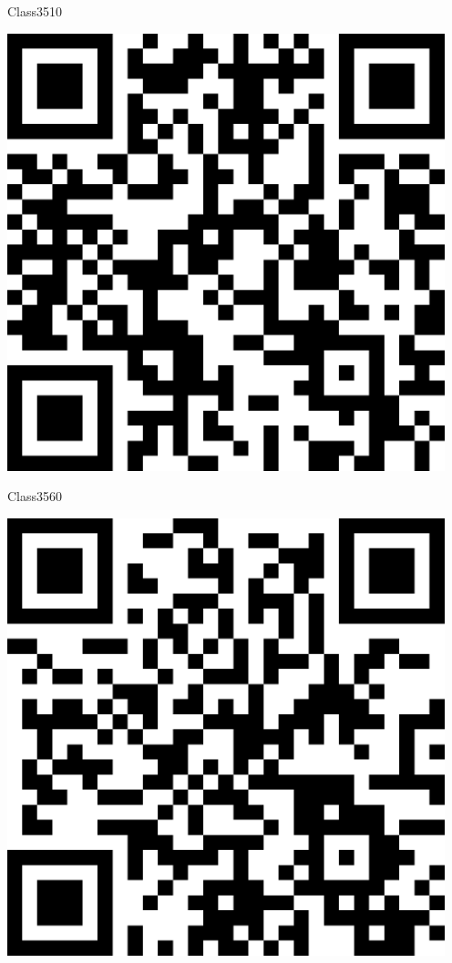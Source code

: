 \documentclass[letterpaper]{article}
\begin{document}
 \hfill{\small Class3510} 

 \vspace{1in} 
 \pagebreak 
{} 
 \vspace*{\fill} 
 \begingroup 
 \centerline{\includegraphics[scale=1,width=5in,height=5in]{Class3560.png}} 
 \endgroup 
 \vspace*{\fill} 

 \hfill{\small Class3560} 

 \vspace{1in} 
 \pagebreak 
{} 
 \vspace*{\fill} 
 \begingroup 
 \centerline{\includegraphics[scale=1,width=5in,height=5in]{Class3690.png}} 
 \endgroup 
 \vspace*{\fill} 
\end{document}
